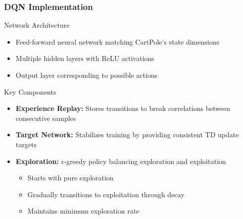\documentclass[
    9pt,
    aspectratio=169,
]{beamer}
\begin{document}
\begin{frame}
\frametitle{DQN Implementation}
\begin{block}{Network Architecture}
    \begin{itemize}
        \item Feed-forward neural network matching CartPole's state dimensions
        \item Multiple hidden layers with ReLU activations
        \item Output layer corresponding to possible actions
    \end{itemize}
\end{block}

\begin{block}{Key Components}
    \begin{itemize}
        \item \textbf{Experience Replay:} Stores transitions to break correlations between consecutive samples
        \item \textbf{Target Network:} Stabilizes training by providing consistent TD update targets
        \item \textbf{Exploration:} $\epsilon$-greedy policy balancing exploration and exploitation
        \begin{itemize}
            \item Starts with pure exploration
            \item Gradually transitions to exploitation through decay
            \item Maintains minimum exploration rate
        \end{itemize}
    \end{itemize}
\end{block}
\end{frame}
\end{document}
